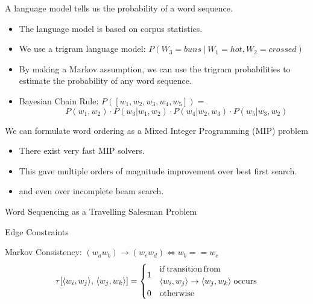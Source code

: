 \documentclass[]{beamer}
\newcommand{\fullwidthtikz}[1]{\resizebox{0.9\textwidth}{!}{
		\centering
		}}
\newcommand{\displayunskip}{\vspace{0pt}}
\begin{document}
\begin{frame}{A language model tells us the probability of a word sequence.}
	\begin{itemize}
		\item The language model is based on corpus statistics.
		\item We use a \alert{trigram language model}: $P(W_3=buns\:|\:W_1=hot, W_2=crossed)$
		\item<2-> By making a Markov assumption, we can use the trigram probabilities to estimate the \alert{probability of any word sequence.}
		\item<3-> Bayesian Chain Rule: $P([w_1,w_2,w_3,w_4,w_5])=$
		$$\qquad \quad P(w_1,w_2)\cdot P(w_3|w_1,w_2)\cdot P(w_4|w_2,w_3) \cdot P(w_5|w_3,w_2)$$
		
	\end{itemize}
	
\end{frame}


\begin{frame}{We can formulate word ordering as a Mixed Integer Programming (MIP) problem}
	\begin{itemize}
		\item There exist very fast MIP solvers.
		\item This gave multiple orders of magnitude improvement over \alert{best first search}.
		\item and even over incomplete \alert{beam search}.
	\end{itemize}
\end{frame}

\begin{frame}{Word Sequencing as a Travelling Salesman Problem}
	\vspace{-1em}
	\fullwidthtikz{../figs/ordergraphpaper}
	 
\end{frame}

\begin{frame}{Edge Constraints}
	\vspace{-1em} 
	\fullwidthtikz{../figs/ordergraphpaper}
	
	\alert{Markov Consistency:} $(w_aw_b)\to (w_cw_d) \iff w_b==w_c$
	\displayunskip
	\begin{gather*}
	\tau[\langle w_{i},w_{j}\rangle,\,\langle w_{j},w_{k}\rangle] = %
	\begin{cases}
	\multirow{2}{*}{1} & \mathrm{if\,transition\,from} \\
	& \langle w_{i},w_{j}\rangle \to \langle w_{j},w_{k}\rangle
	\;\mathrm{ occurs} \\
	0  & \mathrm{otherwise}
	\end{cases}
	\end{gather*}
\end{frame}
\end{document}
